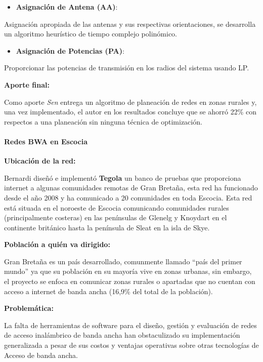 \documentclass[]{article}
\providecommand{\tightlist}{%
  \setlength{\itemsep}{0pt}\setlength{\parskip}{0pt}}
\let\oldparagraph\paragraph
\renewcommand{\paragraph}[1]{\oldparagraph{#1}\mbox{}}
\begin{document}
\begin{itemize}
\tightlist
\item
  \textbf{Asignación de Antena (AA)}:
\end{itemize}

Asignación apropiada de las antenas y sus respectivas orientaciones, se
desarrolla un algoritmo heurístico de tiempo complejo polinómico.

\begin{itemize}
\tightlist
\item
  \textbf{Asignación de Potencias (PA)}:
\end{itemize}

Proporcionar las potencias de transmisión en los radios del sistema
usando LP.

\textbf{Aporte final:}

Como aporte \emph{Sen} entrega un algoritmo de planeación de redes en
zonas rurales y, una vez implementado, el autor en los resultados
concluye que se ahorró 22\% con respectos a una planeación sin ninguna
técnica de optimización.

\paragraph{Redes BWA en Escocia}\label{redes-bwa-en-escocia}

\textbf{Ubicación de la red:}

Bernardi diseñó e implementó \textbf{Tegola} un banco de pruebas que
proporciona internet a algunas comunidades remotas de Gran Bretaña, esta
red ha funcionado desde el año 2008 y ha comunicado a 20 comunidades en
toda Escocia. Esta red está situada en el noroeste de Escocia
comunicando comunidades rurales (principalmente costeras) en las
penínsulas de Glenelg y Knoydart en el continente británico hasta la
península de Sleat en la isla de Skye.

\textbf{Población a quién va dirigido:}

Gran Bretaña es un país desarrollado, comunmente llamado ``país del
primer mundo'' ya que su población en su mayoría vive en zonas urbanas,
sin embargo, el proyecto se enfoca en comunicar zonas rurales o
apartadas que no cuentan con acceso a internet de banda ancha (16,9\%
del total de la población).

\textbf{Problemática:}

La falta de herramientas de software para el diseño, gestión y
evaluación de redes de acceso inalámbrico de banda ancha han
obstaculizado su implementación generalizada a pesar de sus costos y
ventajas operativas sobre otras tecnologías de Acceso de banda ancha.
\end{document}
